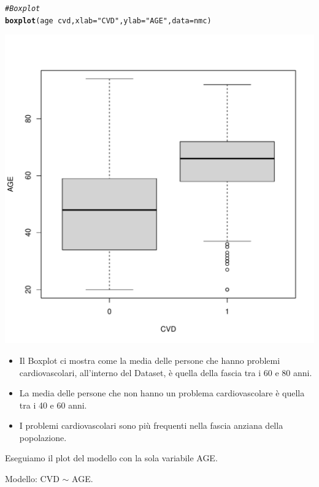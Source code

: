 \documentclass{article}\usepackage[]{graphicx}\usepackage[]{xcolor}
\makeatletter
\def\maxwidth{ %
  \ifdim\Gin@nat@width>\linewidth
    \linewidth
  \else
    \Gin@nat@width
  \fi
}
\newcommand{\hlstr}[1]{\textcolor[rgb]{0.192,0.494,0.8}{#1}}%
\newcommand{\hlcom}[1]{\textcolor[rgb]{0.678,0.584,0.686}{\textit{#1}}}%
\newcommand{\hlopt}[1]{\textcolor[rgb]{0,0,0}{#1}}%
\newcommand{\hlstd}[1]{\textcolor[rgb]{0.345,0.345,0.345}{#1}}%
\newcommand{\hlkwc}[1]{\textcolor[rgb]{0.333,0.667,0.333}{#1}}%
\newcommand{\hlkwd}[1]{\textcolor[rgb]{0.737,0.353,0.396}{\textbf{#1}}}%
\newenvironment{kframe}{%
 \def\at@end@of@kframe{}%
 \ifinner\ifhmode%
  \def\at@end@of@kframe{\end{minipage}}%
  \begin{minipage}{\columnwidth}%
 \fi\fi%
 \def\FrameCommand##1{\hskip\@totalleftmargin \hskip-\fboxsep
 \colorbox{shadecolor}{##1}\hskip-\fboxsep
     \hskip-\linewidth \hskip-\@totalleftmargin \hskip\columnwidth}%
 \MakeFramed {\advance\hsize-\width
   \@totalleftmargin\z@ \linewidth\hsize
   \@setminipage}}%
 {\par\unskip\endMakeFramed%
 \at@end@of@kframe}
\newenvironment{knitrout}{}{} %
\makeatother
\begin{document}
\begin{knitrout}
\color{fgcolor}\begin{kframe}
\begin{alltt}
\hlcom{#Boxplot}
\hlkwd{boxplot}\hlstd{(age}\hlopt{~}\hlstd{cvd,} \hlkwc{xlab}\hlstd{=}\hlstr{"CVD"}\hlstd{,} \hlkwc{ylab}\hlstd{=}\hlstr{"AGE"}\hlstd{,} \hlkwc{data}\hlstd{=nmc)}
\end{alltt}
\end{kframe}
\includegraphics[width=\maxwidth]{figure/RLS_Age_Boxplot-1} 
\end{knitrout}
    
    \begin{itemize}
      \item Il Boxplot ci mostra come la media delle persone che hanno problemi
            cardiovascolari, all'interno del Dataset, è quella della fascia
            tra i 60 e 80 anni.
      \item La media delle persone che non hanno un problema cardiovascolare è
            quella tra i 40 e 60 anni.
      \item I problemi cardiovascolari sono più frequenti nella fascia anziana
            della popolazione.
    \end{itemize}
    
    Eseguiamo il plot del modello con la sola variabile AGE.\par
    Modello: CVD $\sim$ AGE.
    
\end{document}
